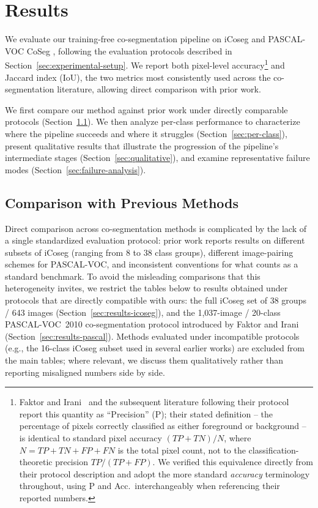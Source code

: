 \section{Results}
\label{sec:results}

We evaluate our training-free co-segmentation pipeline on iCoseg \cite{batra2010icoseg} and PASCAL-VOC CoSeg \cite{everingham2010pascal, faktor2013}, following the evaluation protocols described in Section~\ref{sec:experimental-setup}. We report both pixel-level accuracy\footnote{Faktor and Irani~\cite{faktor2013} and the subsequent literature following their protocol report this quantity as ``Precision'' (P); their stated definition -- the percentage of pixels correctly classified as either foreground or background -- is identical to standard pixel accuracy $(TP+TN)/N$, where $N = TP+TN+FP+FN$ is the total pixel count, not to the classification-theoretic precision $TP/(TP+FP)$. We verified this equivalence directly from their protocol description and adopt the more standard \emph{accuracy} terminology throughout, using P and Acc.\ interchangeably when referencing their reported numbers.} and Jaccard index (IoU), the two metrics most consistently used across the co-segmentation literature, allowing direct comparison with prior work.

We first compare our method against prior work under directly comparable protocols (Section~\ref{sec:comparison}). We then analyze per-class performance to characterize where the pipeline succeeds and where it struggles (Section~\ref{sec:per-class}), present qualitative results that illustrate the progression of the pipeline's intermediate stages (Section~\ref{sec:qualitative}), and examine representative failure modes (Section~\ref{sec:failure-analysis}).

\subsection{Comparison with Previous Methods}
\label{sec:comparison}

Direct comparison across co-segmentation methods is complicated by the lack of a single standardized evaluation protocol: prior work reports results on different subsets of iCoseg (ranging from 8 to 38 class groups), different image-pairing schemes for PASCAL-VOC, and inconsistent conventions for what counts as a standard benchmark. To avoid the misleading comparisons that this heterogeneity invites, we restrict the tables below to results obtained under protocols that are directly compatible with ours: the full iCoseg set of 38 groups / 643 images (Section~\ref{sec:results-icoseg}), and the 1{,}037-image / 20-class PASCAL-VOC~2010 co-segmentation protocol introduced by Faktor and Irani~\cite{faktor2013} (Section~\ref{sec:results-pascal}). Methods evaluated under incompatible protocols (e.g., the 16-class iCoseg subset used in several earlier works) are excluded from the main tables; where relevant, we discuss them qualitatively rather than reporting misaligned numbers side by side.

